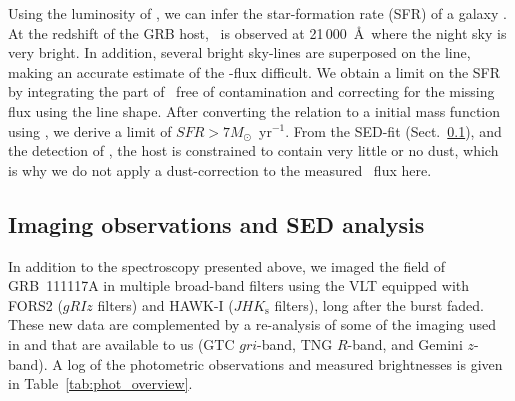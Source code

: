 \documentclass{aa}    %
\begin{document}
Using the luminosity of \ha, we can infer the star-formation rate (SFR) of a 
galaxy \citep{Kennicutt1998}. At the redshift of the GRB host, \ha~is observed at 
21\,000~\AA~where the night sky is very bright. In addition, several bright sky-lines 
are superposed on the line, making an accurate estimate of the \ha-flux difficult. 
We obtain a limit on the SFR by integrating the part of \ha~free of contamination and 
correcting for the missing flux using the line shape. After converting the 
\citet{Kennicutt1998} relation to a \citet{Chabrier2003} initial mass function using
\citet{Madau2014}, we derive a limit of $SFR > 7 M_\odot$~yr$^{-1}$. 
From the SED-fit (Sect.~\ref{SED}), and the detection of \lya, the host is
constrained to contain very little or no dust, which is why we do not apply 
a dust-correction to the measured \ha~flux here. 




\subsection{Imaging observations and SED analysis} \label{SED}

In addition to the spectroscopy presented above, we imaged the field of
GRB~111117A in multiple broad-band filters using the VLT equipped with FORS2
($gRIz$ filters) and HAWK-I ($JHK_{\mathrm{s}}$ filters), long after the burst
faded. These new data are complemented by a re-analysis of some of the imaging
used in \citet{Margutti2012} and \citet{Sakamoto2013} that are available to us
(GTC $gri$-band, TNG $R$-band, and Gemini $z$-band). A log of the photometric
observations and measured brightnesses is given in
Table~\ref{tab:phot_overview}.
\end{document}
